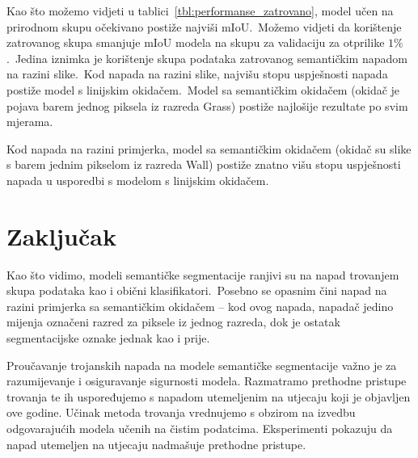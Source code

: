 \documentclass[times, utf8, seminar, numeric]{fer}
\begin{document}
Kao što možemo vidjeti u tablici~\ref{tbl:performanse_zatrovano}, model učen na prirodnom skupu očekivano postiže najviši mIoU.\ 
Možemo vidjeti da korištenje zatrovanog skupa smanjuje mIoU modela na skupu za validaciju za otprilike $1\%$.\ Jedina iznimka je korištenje skupa podataka zatrovanog semantičkim napadom na razini slike.\ 
Kod napada na razini slike, najvišu stopu uspješnosti napada postiže model s linijskim okidačem.\ Model sa semantičkim okidačem (okidač je pojava barem jednog piksela iz razreda Grass) postiže najlošije rezultate po svim mjerama.

Kod napada na razini primjerka, model sa semantičkim okidačem (okidač su slike s barem jednim pikselom iz razreda Wall) postiže znatno višu stopu uspješnosti napada u usporedbi s modelom s linijskim okidačem.


\chapter{Zaključak}

Kao što vidimo, modeli semantičke segmentacije ranjivi su na napad trovanjem skupa podataka kao i obični klasifikatori.\ 
Posebno se opasnim čini napad na razini primjerka sa semantičkim okidačem – kod ovog napada, napadač jedino mijenja označeni razred za piksele iz jednog razreda, dok je ostatak segmentacijske oznake jednak kao i prije.




\begin{sazetak}

    Proučavanje trojanskih napada na modele semantičke segmentacije važno je za razumijevanje i osiguravanje sigurnosti modela. 
    Razmatramo prethodne pristupe trovanja te ih uspoređujemo s napadom utemeljenim na utjecaju koji je objavljen ove godine. 
    Učinak metoda trovanja vrednujemo s obzirom na izvedbu odgovarajućih modela učenih na čistim podatcima. 
    Eksperimenti pokazuju da napad utemeljen na utjecaju nadmašuje prethodne pristupe.
    

\end{sazetak}
    
\end{document}
